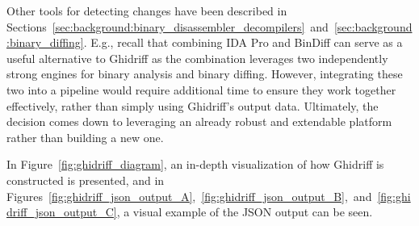 Other tools for detecting changes have been described in Sections~\ref{sec:background:binary_disassembler_decompilers}~and~\ref{sec:background:binary_diffing}. E.g., recall that combining IDA Pro and BinDiff can serve as a useful alternative to Ghidriff as the combination leverages two independently strong engines for binary analysis and binary diffing. However, integrating these two into a pipeline would require additional time to ensure they work together effectively, rather than simply using Ghidriff's output data. Ultimately, the decision comes down to leveraging an already robust and extendable platform rather than building a new one. 

In Figure~\ref{fig:ghidriff_diagram}, an in-depth visualization of how Ghidriff is constructed is presented, and in Figures~\ref{fig:ghidriff_json_output_A},~\ref{fig:ghidriff_json_output_B},~and~\ref{fig:ghidriff_json_output_C}, a visual example of the JSON output can be seen.



